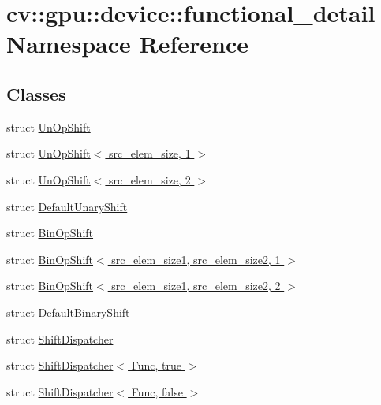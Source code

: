 \hypertarget{namespacecv_1_1gpu_1_1device_1_1functional__detail}{\section{cv\-:\-:gpu\-:\-:device\-:\-:functional\-\_\-detail Namespace Reference}
\label{namespacecv_1_1gpu_1_1device_1_1functional__detail}
}
\subsection*{Classes}
\begin{DoxyCompactItemize}
\item 
struct \hyperlink{structcv_1_1gpu_1_1device_1_1functional__detail_1_1UnOpShift}{Un\-Op\-Shift}
\item 
struct \hyperlink{structcv_1_1gpu_1_1device_1_1functional__detail_1_1UnOpShift_3_01src__elem__size_00_011_01_4}{Un\-Op\-Shift$<$ src\-\_\-elem\-\_\-size, 1 $>$}
\item 
struct \hyperlink{structcv_1_1gpu_1_1device_1_1functional__detail_1_1UnOpShift_3_01src__elem__size_00_012_01_4}{Un\-Op\-Shift$<$ src\-\_\-elem\-\_\-size, 2 $>$}
\item 
struct \hyperlink{structcv_1_1gpu_1_1device_1_1functional__detail_1_1DefaultUnaryShift}{Default\-Unary\-Shift}
\item 
struct \hyperlink{structcv_1_1gpu_1_1device_1_1functional__detail_1_1BinOpShift}{Bin\-Op\-Shift}
\item 
struct \hyperlink{structcv_1_1gpu_1_1device_1_1functional__detail_1_1BinOpShift_3_01src__elem__size1_00_01src__elem__size2_00_011_01_4}{Bin\-Op\-Shift$<$ src\-\_\-elem\-\_\-size1, src\-\_\-elem\-\_\-size2, 1 $>$}
\item 
struct \hyperlink{structcv_1_1gpu_1_1device_1_1functional__detail_1_1BinOpShift_3_01src__elem__size1_00_01src__elem__size2_00_012_01_4}{Bin\-Op\-Shift$<$ src\-\_\-elem\-\_\-size1, src\-\_\-elem\-\_\-size2, 2 $>$}
\item 
struct \hyperlink{structcv_1_1gpu_1_1device_1_1functional__detail_1_1DefaultBinaryShift}{Default\-Binary\-Shift}
\item 
struct \hyperlink{structcv_1_1gpu_1_1device_1_1functional__detail_1_1ShiftDispatcher}{Shift\-Dispatcher}
\item 
struct \hyperlink{structcv_1_1gpu_1_1device_1_1functional__detail_1_1ShiftDispatcher_3_01Func_00_01true_01_4}{Shift\-Dispatcher$<$ Func, true $>$}
\item 
struct \hyperlink{structcv_1_1gpu_1_1device_1_1functional__detail_1_1ShiftDispatcher_3_01Func_00_01false_01_4}{Shift\-Dispatcher$<$ Func, false $>$}
\end{DoxyCompactItemize}
